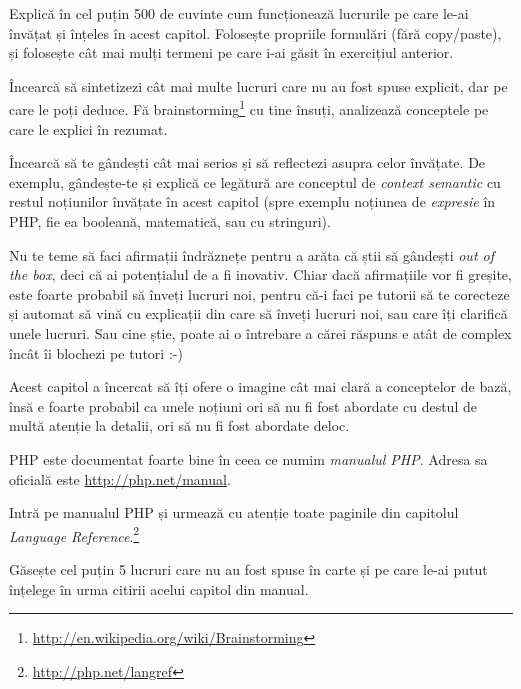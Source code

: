 \begin{Exercise}[title={Rezumat},difficulty=2]
Explică în cel puțin 500 de cuvinte cum funcționează lucrurile pe care le-ai învățat și înțeles în acest
capitol. Folosește propriile formulări (fără copy/paste), și folosește cât mai mulți termeni
pe care i-ai găsit în exercițiul anterior.

Încearcă să sintetizezi cât mai multe lucruri care nu au fost spuse explicit, dar pe care
le poți deduce. Fă brainstorming\footnote{\url{http://en.wikipedia.org/wiki/Brainstorming}}
cu tine însuți, analizează conceptele
pe care le explici în rezumat.

Încearcă să te gândești cât mai serios și să reflectezi
asupra celor învățate.
De exemplu, gândește-te și explică ce legătură are conceptul de \textit{context semantic} cu
restul noțiunilor învățate în acest capitol (spre exemplu noțiunea de \textit{expresie} în PHP,
fie ea booleană, matematică, sau cu stringuri).

Nu te teme să faci afirmații îndrăznețe pentru a arăta că știi să gândești \textit{out
of the box}, deci că ai potențialul de a fi inovativ. Chiar dacă afirmațiile vor
fi greșite, este foarte probabil să înveți lucruri noi, pentru că-i faci 
pe tutorii {\phpro} să te corecteze și automat să vină cu explicații din care
să înveți lucruri noi, sau care îți clarifică unele lucruri. Sau cine știe,
poate ai o întrebare a cărei răspuns e atât de complex încât îi blochezi
pe tutori :-)
\end{Exercise}

\begin{Exercise}[title={Language Reference}]
Acest capitol a încercat să îți ofere o imagine cât mai clară a conceptelor
de bază, însă e foarte probabil ca unele noțiuni ori să nu fi fost
abordate cu destul de multă atenție la detalii, ori să nu fi fost abordate deloc.

PHP este documentat foarte bine în ceea ce numim \textit{manualul PHP}. Adresa
sa oficială este \url{http://php.net/manual}.

Intră pe manualul PHP și urmează cu atenție toate paginile din capitolul
\textit{Language Reference}.\footnote{\url{http://php.net/langref}}


Găsește cel puțin 5 lucruri care nu au fost spuse în carte și pe
care le-ai putut înțelege în urma citirii acelui capitol din manual.
\end{Exercise}

